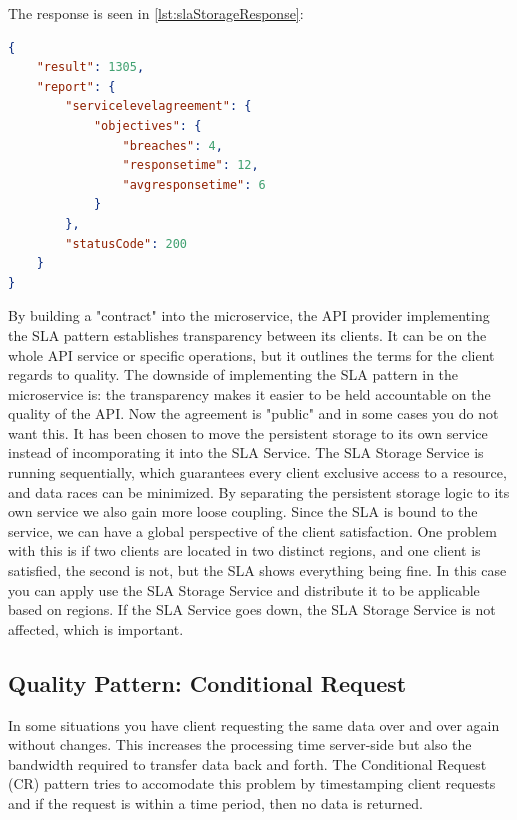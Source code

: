 \documentclass[12pt]{article}
\begin{document}
The response is seen in \ref{lst:slaStorageResponse}:

\begin{lstlisting}[caption=The response to the client when a calculation is requested, 
captionpos=b, language=json, label=slaStorageResponse]
{
    "result": 1305,
    "report": {
        "servicelevelagreement": {
            "objectives": {
                "breaches": 4,
                "responsetime": 12,
                "avgresponsetime": 6
            }
        },
        "statusCode": 200
    }
}
\end{lstlisting}

By building a "contract" into the microservice, the API provider implementing the SLA pattern establishes transparency between its clients. It can be on the whole API service or specific operations, but it outlines the terms for the client regards to quality. The downside of implementing the SLA pattern in the microservice is: the transparency makes it easier to be held accountable on the quality of the API. Now the agreement is "public" and in some cases you do not want this. It has been chosen to move the persistent storage to its own service instead of incomporating it into the SLA Service. The SLA Storage Service is running sequentially, which guarantees every client exclusive access to a resource, and data races can be minimized. By separating the persistent storage logic to its own service we also gain more loose coupling. Since the SLA is bound to the service, we can have a global perspective of the client satisfaction. One problem with this is if two clients are located in two distinct regions, and one client is satisfied, the second is not, but the SLA shows everything being fine. In this case you can apply use the SLA Storage Service and distribute it to be applicable based on regions. If the SLA Service goes down, the SLA Storage Service is not affected, which is important. 

\subsection{Quality Pattern: Conditional Request}
In some situations you have client requesting the same data over and over again without changes. This increases the processing time server-side but also the bandwidth required to transfer data back and forth. The Conditional Request (CR) pattern tries to accomodate this problem by timestamping client requests and if the request is within a time period, then no data is returned. \\
\end{document}
